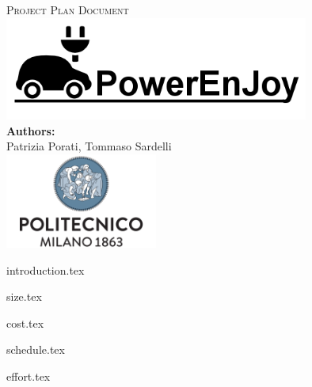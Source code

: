 \documentclass[a4paper,11pt]{article}
\begin{document}
\begin{titlepage}
\begin{center}
\textsc{\LARGE Project Plan Document}\\[1.5cm] %

\includegraphics[width=10cm]{PowerEnJoy.png}\\
\vfill
\vfill
\textbf{Authors:}\\
Patrizia Porati, Tommaso Sardelli\\[2.0cm] 


\vfill
\vfill
\includegraphics[width=50mm]{polimi.png}\\
\end{center}
\end{titlepage}

\tableofcontents
\pagebreak

{introduction.tex}


{size.tex}


{cost.tex}


{schedule.tex}



{effort.tex}
\end{document}

